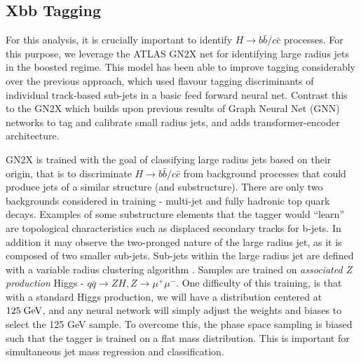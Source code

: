 \documentclass[12pt]{article}
\begin{document}
\subsection{Xbb Tagging} For this analysis, it is crucially important to
identify $H\rightarrow b\bar{b} / c\bar{c}$ processes. For this purpose, we
leverage the ATLAS GN2X \cite{boosted_hbbcc_tagger} net for identifying large
radius jets in the boosted regime. This model has been able to improve tagging
considerably over the previous approach, which used flavour tagging
discriminants of individual track-based sub-jets in a basic feed forward neural
net. Contrast this to the GN2X which builds upon previous results of Graph
Neural Net (GNN) networks to tag and calibrate small radius jets, and adds
transformer-encoder architecture.


GN2X is trained with the goal of classifying large radius jets based on their
origin, that is to discriminate $H\rightarrow b\bar{b}/c\bar{c}$ from background
processes that could produce jets of a similar structure (and substructure).
There are only two backgrounds considered in training - multi-jet and fully
hadronic top quark decays. Examples of some substructure elements that the
tagger would ``learn'' are topological characteristics such as displaced
secondary tracks for b-jets. In addition it may observe the two-pronged nature
of the large radius jet, as it is composed of two smaller sub-jets. Sub-jets
within the large radius jet are defined with a variable radius clustering
algorithm \cite{jet_substructure}. Samples are trained on \textit{associated Z
production} Higgs - $q\bar{q}\rightarrow ZH, Z\rightarrow \mu^+\mu^-$. One
difficulty of this training, is that with a standard Higgs production, we will
have a distribution centered at $125 \;\text{GeV}$, and any neural network will
simply adjust the weights and biases to select the 125 GeV sample. To overcome
this, the phase space sampling is biased such that the tagger is trained on a
flat mass distribution. This is important for simultaneous jet mass regression
and classification.
\end{document}
